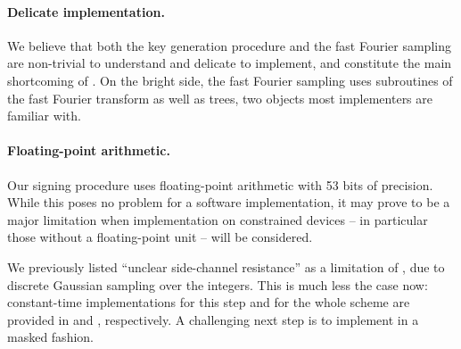 
\paragraph{Delicate implementation.} We believe that both the key generation procedure and the fast Fourier sampling are non-trivial to understand and delicate to implement, and constitute the main shortcoming of \falcon. On the bright side, the fast Fourier sampling uses subroutines of the fast Fourier transform as well as trees, two objects most implementers are familiar with.

\paragraph{Floating-point arithmetic.} Our signing procedure uses floating-point arithmetic with 53 bits of precision. While this poses no problem for a software implementation, it may prove to be a major limitation when implementation on constrained devices -- in particular those without a floating-point unit -- will be considered.



\medskip

We previously listed ``unclear side-channel resistance'' as a limitation of \falcon, due to discrete Gaussian sampling over the integers. This is much less the case now: constant-time implementations for this step and for the whole scheme are provided in \cite{PQCRYPTO:HPRR20} and \cite{EPRINT:Pornin19}, respectively. A challenging next step is to implement \falcon in a masked fashion.